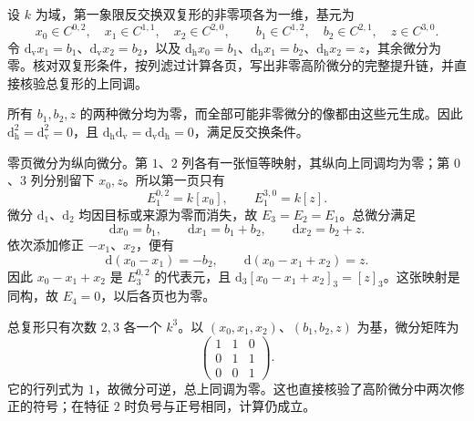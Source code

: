 \begin{exercise}\label{g2:ex:nonzero-d3-staircase}
	设 \(k\) 为域，第一象限反交换双复形的非零项各为一维，基元为
	\[
		x_0\in C^{0,2},\quad x_1\in C^{1,1},\quad x_2\in C^{2,0},\qquad
		b_1\in C^{1,2},\quad b_2\in C^{2,1},\quad z\in C^{3,0}.
	\]
	令 \(\mathrm d_{\mathrm v}x_1=b_1\)、\(\mathrm d_{\mathrm v}x_2=b_2\)，以及 \(\mathrm d_{\mathrm h}x_0=b_1\)、\(\mathrm d_{\mathrm h}x_1=b_2\)、\(\mathrm d_{\mathrm h}x_2=z\)，其余微分为零。核对双复形条件，按列滤过计算各页，写出非零高阶微分的完整提升链，并直接核验总复形的上同调。
\end{exercise}
\begin{solution}
	所有 \(b_1,b_2,z\) 的两种微分均为零，而全部可能非零微分的像都由这些元生成。因此 \(\mathrm d_{\mathrm h}^2=\mathrm d_{\mathrm v}^2=0\)，且 \(\mathrm d_{\mathrm h}\mathrm d_{\mathrm v}=\mathrm d_{\mathrm v}\mathrm d_{\mathrm h}=0\)，满足反交换条件。

	零页微分为纵向微分。第 \(1\)、\(2\) 列各有一张恒等映射，其纵向上同调均为零；第 \(0\)、\(3\) 列分别留下 \(x_0,z\)。所以第一页只有
	\[
		E_1^{0,2}=k[x_0],\qquad E_1^{3,0}=k[z].
	\]
	微分 \(\mathrm d_1\)、\(\mathrm d_2\) 均因目标或来源为零而消失，故 \(E_3=E_2=E_1\)。总微分满足
	\[
		\mathrm dx_0=b_1,\qquad \mathrm dx_1=b_1+b_2,\qquad \mathrm dx_2=b_2+z.
	\]
	依次添加修正 \(-x_1\)、\(x_2\)，便有
	\[
		\mathrm d(x_0-x_1)=-b_2,\qquad
		\mathrm d(x_0-x_1+x_2)=z.
	\]
	因此 \(x_0-x_1+x_2\) 是 \(E_3^{0,2}\) 的代表元，且 \(\mathrm d_3[x_0-x_1+x_2]_3=[z]_3\)。这张映射是同构，故 \(E_4=0\)，以后各页也为零。

	总复形只有次数 \(2,3\) 各一个 \(k^3\)。以 \((x_0,x_1,x_2)\)、\((b_1,b_2,z)\) 为基，微分矩阵为
	\[
		\begin{pmatrix}1&1&0\\0&1&1\\0&0&1\end{pmatrix}.
	\]
	它的行列式为 \(1\)，故微分可逆，总上同调为零。这也直接核验了高阶微分中两次修正的符号；在特征 \(2\) 时负号与正号相同，计算仍成立。
\end{solution}

